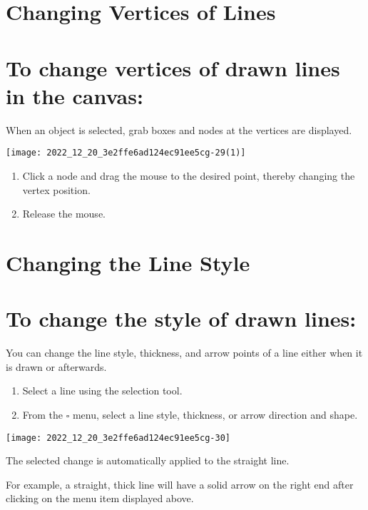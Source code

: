 \section{Changing Vertices of Lines}
\section{To change vertices of drawn lines in the canvas:}
When an object is selected, grab boxes and nodes at the vertices are displayed.

\begin{center}
\texttt{[image: 2022\_12\_20\_3e2ffe6ad124ec91ee5cg-29(1)]}
\end{center}

\begin{enumerate}
  \item Click a node and drag the mouse to the desired point, thereby changing the vertex position.

  \item Release the mouse.

\end{enumerate}

\section{Changing the Line Style}
\section{To change the style of drawn lines:}
You can change the line style, thickness, and arrow points of a line either when it is drawn or afterwards.

\begin{enumerate}
  \item Select a line using the selection tool.

  \item From the $\square$ menu, select a line style, thickness, or arrow direction and shape.

\end{enumerate}

\begin{center}
\texttt{[image: 2022\_12\_20\_3e2ffe6ad124ec91ee5cg-30]}
\end{center}

The selected change is automatically applied to the straight line.

For example, a straight, thick line will have a solid arrow on the right end after clicking on the menu item displayed above.

